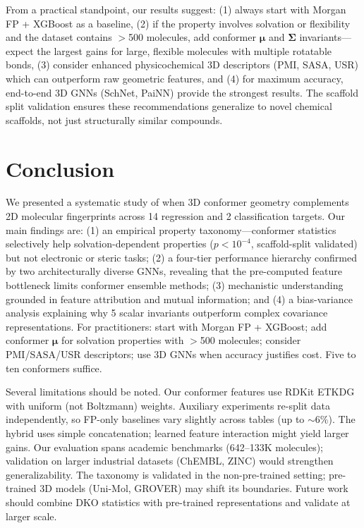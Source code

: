 \documentclass[sigconf]{acmart}
\newcommand{\rev}[1]{#1}
\begin{document}
\rev{From a practical standpoint, our results suggest: (1) always start with Morgan FP + XGBoost as a baseline, (2) if the property involves solvation or flexibility and the dataset contains $>$500 molecules, add conformer $\boldsymbol{\mu}$ and $\boldsymbol{\Sigma}$ invariants---expect the largest gains for large, flexible molecules with multiple rotatable bonds, (3) consider enhanced physicochemical 3D descriptors (PMI, SASA, USR) which can outperform raw geometric features, and (4) for maximum accuracy, end-to-end 3D GNNs (SchNet, PaiNN) provide the strongest results. The scaffold split validation ensures these recommendations generalize to novel chemical scaffolds, not just structurally similar compounds.}

\section{Conclusion}
\label{sec:conclusion}

\rev{We presented a systematic study of when 3D conformer geometry complements 2D molecular fingerprints across 14 regression and 2 classification targets. Our main findings are: (1) an empirical property taxonomy---conformer statistics selectively help solvation-dependent properties ($p < 10^{-4}$, scaffold-split validated) but not electronic or steric tasks; (2) a four-tier performance hierarchy confirmed by two architecturally diverse GNNs, revealing that the pre-computed feature bottleneck limits conformer ensemble methods; (3) mechanistic understanding grounded in feature attribution and mutual information; and (4) a bias-variance analysis explaining why 5 scalar invariants outperform complex covariance representations. For practitioners: start with Morgan FP + XGBoost; add conformer $\boldsymbol{\mu}$ for solvation properties with $>$500 molecules; consider PMI/SASA/USR descriptors; use 3D GNNs when accuracy justifies cost. Five to ten conformers suffice.}

\rev{Several limitations should be noted.} Our conformer features use RDKit ETKDG with uniform (not Boltzmann) weights. Auxiliary experiments re-split data independently, so FP-only baselines vary slightly across tables (up to ${\sim}6\%$). The hybrid uses simple concatenation; learned feature interaction might yield larger gains. \rev{Our evaluation spans academic benchmarks (642--133K molecules); validation on larger industrial datasets (ChEMBL, ZINC) would strengthen generalizability. The taxonomy is validated in the non-pre-trained setting; pre-trained 3D models (Uni-Mol, GROVER) may shift its boundaries.} Future work should combine DKO statistics with pre-trained representations and validate at larger scale.
\end{document}
